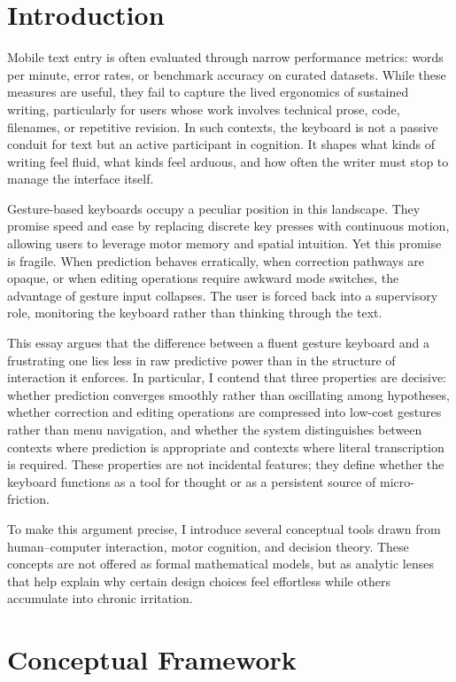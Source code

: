 \documentclass[11pt]{article}
\begin{document}
\newpage
\section{Introduction}

Mobile text entry is often evaluated through narrow performance metrics: words per minute, error rates, or benchmark accuracy on curated datasets. While these measures are useful, they fail to capture the lived ergonomics of sustained writing, particularly for users whose work involves technical prose, code, filenames, or repetitive revision. In such contexts, the keyboard is not a passive conduit for text but an active participant in cognition. It shapes what kinds of writing feel fluid, what kinds feel arduous, and how often the writer must stop to manage the interface itself.

Gesture-based keyboards occupy a peculiar position in this landscape. They promise speed and ease by replacing discrete key presses with continuous motion, allowing users to leverage motor memory and spatial intuition. Yet this promise is fragile. When prediction behaves erratically, when correction pathways are opaque, or when editing operations require awkward mode switches, the advantage of gesture input collapses. The user is forced back into a supervisory role, monitoring the keyboard rather than thinking through the text.

This essay argues that the difference between a fluent gesture keyboard and a frustrating one lies less in raw predictive power than in the structure of interaction it enforces. In particular, I contend that three properties are decisive: whether prediction converges smoothly rather than oscillating among hypotheses, whether correction and editing operations are compressed into low-cost gestures rather than menu navigation, and whether the system distinguishes between contexts where prediction is appropriate and contexts where literal transcription is required. These properties are not incidental features; they define whether the keyboard functions as a tool for thought or as a persistent source of micro-friction.

To make this argument precise, I introduce several conceptual tools drawn from human--computer interaction, motor cognition, and decision theory. These concepts are not offered as formal mathematical models, but as analytic lenses that help explain why certain design choices feel effortless while others accumulate into chronic irritation.

\section{Conceptual Framework}
\end{document}
